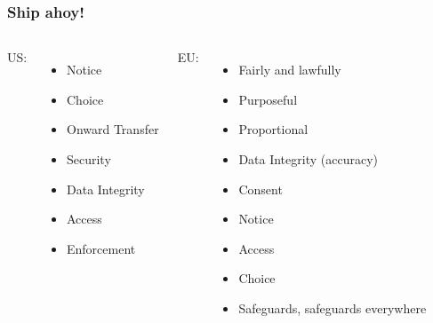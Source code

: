 \documentclass{beamer}
\begin{document}
\begin{frame}
    \frametitle{Ship ahoy!}
    \begin{columns}[t]
        US:
        \begin{itemize}
            \item Notice
            \item Choice
            \item Onward Transfer
            \item Security
            \item Data Integrity
            \item Access
            \item Enforcement
        \end{itemize}
        EU:
        \begin{itemize}
            \item Fairly and lawfully
            \item Purposeful
            \item Proportional
            \item Data Integrity (accuracy)
            \item Consent
            \item Notice
            \item Access
            \item Choice
            \item Safeguards, safeguards everywhere
        \end{itemize}
    \end{columns}


\end{frame}
\end{document}
